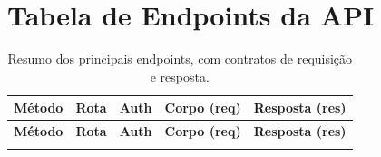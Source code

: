 \documentclass[12pt,a4paper]{article}
\begin{document}
\section{Tabela de Endpoints da API}
\begingroup
\small
\setlength{\tabcolsep}{4pt}%
\renewcommand{\arraystretch}{1.15}%
\begin{longtable}{@{} l l c p{} p{} @{}}
\caption{Resumo dos principais endpoints, com contratos de requisição e resposta.}\label{tab:endpoints}\\
\toprule
\textbf{Método} & \textbf{Rota} & \textbf{Auth} & \textbf{Corpo (req)} & \textbf{Resposta (res)} \\
\midrule
\endfirsthead
\toprule
\textbf{Método} & \textbf{Rota} & \textbf{Auth} & \textbf{Corpo (req)} & \textbf{Resposta (res)} \\
\midrule
\endhead
\bottomrule
\endfoot
\bottomrule
\endlastfoot


\end{longtable}
\end{document}
